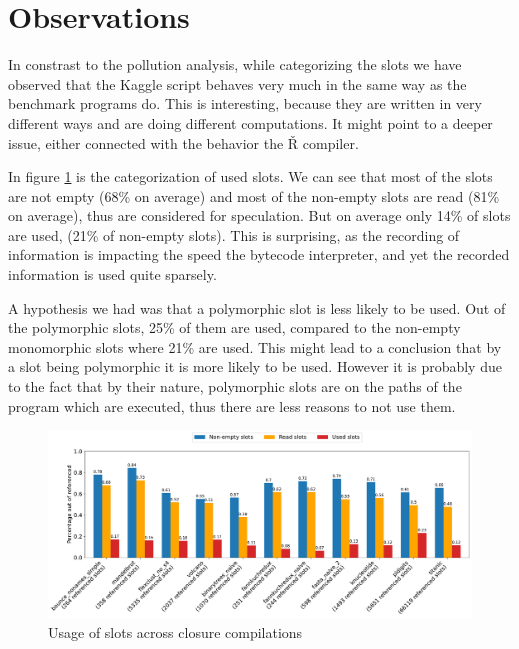 \section{Observations}


In constrast to the pollution analysis, while categorizing the slots we have observed that the Kaggle script behaves very much in the same way as the benchmark programs do. This is interesting, because they are written in very different ways and are doing different computations. It might point to a deeper issue, either connected with the behavior the Ř compiler.

In figure \ref{fig:graph-overview} is the categorization of used slots. We can see that most of the slots are not empty (68\% on average) and most of the non-empty slots are read (81\% on average), thus are considered for speculation. But on average only 14\% of slots are used, (21\% of non-empty slots). This is surprising, as the recording of information is impacting the speed the bytecode interpreter, and yet the recorded information is used quite sparsely.

A hypothesis we had was that a polymorphic slot is less likely to be used. Out of the polymorphic slots, 25\% of them are used, compared to the non-empty monomorphic slots where 21\% are used. This might lead to a conclusion that by a slot being polymorphic it is more likely to be used. However it is probably due to the fact that by their nature, polymorphic slots are on the paths of the program which are executed, thus there are less reasons to not use them.

\begin{figure}
	\centering
	\begin{adjustwidth}{-3cm}{-3cm}
		\includegraphics[width=1.5\textwidth]{figures/usage_overall.pdf}
	\end{adjustwidth}
	\caption{Usage of slots across closure compilations}\label{fig:graph-overview}
\end{figure}

